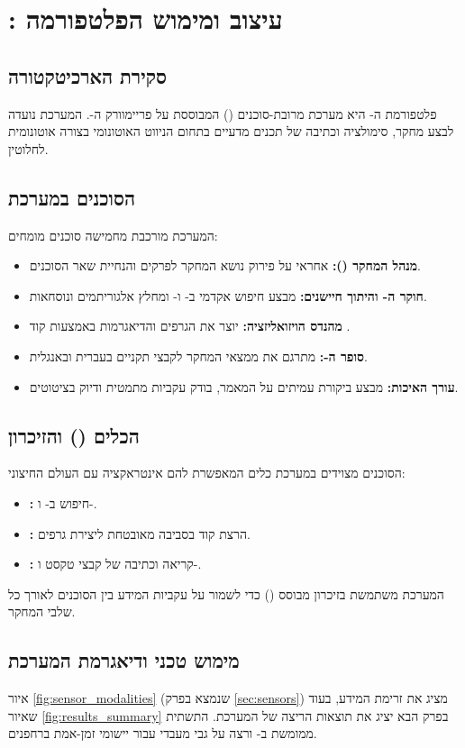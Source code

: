 
\section{: עיצוב ומימוש הפלטפורמה}
\label{sec:oursystem}

\subsection{סקירת הארכיטקטורה}
פלטפורמת ה- היא מערכת מרובת-סוכנים () המבוססת על פריימוורק ה-. המערכת נועדה לבצע מחקר, סימולציה וכתיבה של תכנים מדעיים בתחום הניווט האוטונומי בצורה אוטונומית לחלוטין.

\subsection{הסוכנים במערכת}
המערכת מורכבת מחמישה סוכנים מומחים:
\begin{itemize}
    \item \textbf{מנהל המחקר ():} אחראי על פירוק נושא המחקר לפרקים והנחיית שאר הסוכנים.
    \item \textbf{חוקר ה- והיתוך חיישנים:} מבצע חיפוש אקדמי ב- ו- ומחלץ אלגוריתמים ונוסחאות.
    \item \textbf{מהנדס הויזואליזציה:} יוצר את הגרפים והדיאגרמות באמצעות קוד .
    \item \textbf{סופר ה-:} מתרגם את ממצאי המחקר לקבצי  תקניים בעברית ובאנגלית.
    \item \textbf{עורך האיכות:} מבצע ביקורת עמיתים על המאמר, בודק עקביות מתמטית ודיוק בציטוטים.
\end{itemize}

\subsection{הכלים () והזיכרון}
הסוכנים מצוידים במערכת כלים המאפשרת להם אינטראקציה עם העולם החיצוני:
\begin{itemize}
    \item \textbf{:} חיפוש ב- ו-.
    \item \textbf{:} הרצת קוד  בסביבה מאובטחת ליצירת גרפים.
    \item \textbf{:} קריאה וכתיבה של קבצי טקסט ו-.
\end{itemize}
המערכת משתמשת בזיכרון מבוסס  () כדי לשמור על עקביות המידע בין הסוכנים לאורך כל שלבי המחקר. \cite{CrewAIDocs}

\subsection{מימוש טכני ודיאגרמת המערכת}
איור \ref{fig:sensor_modalities} (שנמצא בפרק \ref{sec:sensors}) מציג את זרימת המידע, בעוד שאיור \ref{fig:results_summary} בפרק הבא יציג את תוצאות הריצה של המערכת. התשתית ממומשת ב- ורצה על גבי מעבדי  עבור יישומי זמן-אמת ברחפנים.

